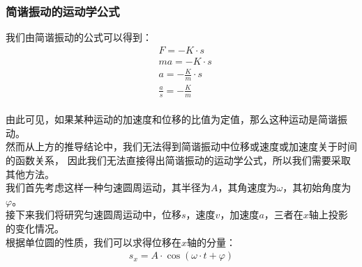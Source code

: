 \documentclass[UTF8]{ctexart}
\begin{document}
\subsubsection{简谐振动的运动学公式}
    我们由简谐振动的公式可以得到：
    \setcounter{equation}{0}
    \begin{align}
        &F=-K\cdot s\\[4mm]
        &ma=-K\cdot s\\[4mm]
        &a=-\frac{K}{m}\cdot s\\[4mm]
        &\frac{a}{s}=-\frac{K}{m}
    \end{align}\\
    由此可见，如果某种运动的加速度和位移的比值为定值，那么这种运动是简谐振动。\\[3mm]
    然而从上方的推导结论中，我们无法得到简谐振动中位移或速度或加速度关于时间的函数关系，
    因此我们无法直接得出简谐振动的运动学公式，所以我们需要采取其他方法。\\[6mm]
    我们首先考虑这样一种匀速圆周运动，其半径为$A$，其角速度为$\omega$，其初始角度为$\varphi$。\\[3mm]
    接下来我们将研究匀速圆周运动中，位移$s$，速度$v$，加速度$a$，三者在$x$轴上投影的变化情况。\\[8mm]
    根据单位圆的性质，我们可以求得位移在$x$轴的分量：
    \begin{align}
        s_x=A\cdot \cos{\left(\omega\cdot t+\varphi\right)}
    \end{align}\\

\newpage
\end{document}
